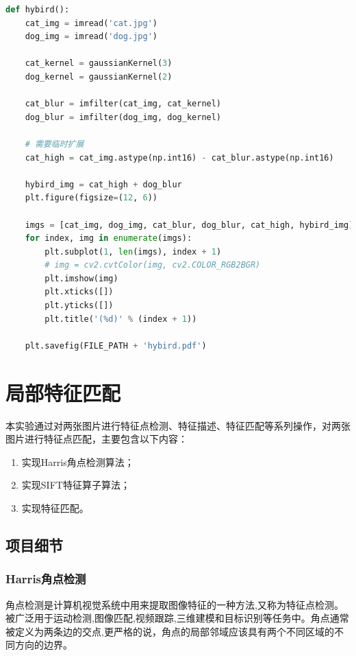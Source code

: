 \documentclass{article}
\begin{document}
\begin{lstlisting}[language=Python, frame=shadowbox]
def hybird():
    cat_img = imread('cat.jpg')
    dog_img = imread('dog.jpg')

    cat_kernel = gaussianKernel(3)
    dog_kernel = gaussianKernel(2)

    cat_blur = imfilter(cat_img, cat_kernel)
    dog_blur = imfilter(dog_img, dog_kernel)

    # 需要临时扩展
    cat_high = cat_img.astype(np.int16) - cat_blur.astype(np.int16)

    hybird_img = cat_high + dog_blur
    plt.figure(figsize=(12, 6))

    imgs = [cat_img, dog_img, cat_blur, dog_blur, cat_high, hybird_img]
    for index, img in enumerate(imgs):
        plt.subplot(1, len(imgs), index + 1)
        # img = cv2.cvtColor(img, cv2.COLOR_RGB2BGR)
        plt.imshow(img)
        plt.xticks([])
        plt.yticks([])
        plt.title('(%d)' % (index + 1))

    plt.savefig(FILE_PATH + 'hybird.pdf')
\end{lstlisting}

\section{局部特征匹配}
\begin{question}
    本实验通过对两张图片进行特征点检测、特征描述、特征匹配等系列操作，对两张图片进行特征点匹配，主要包含以下内容：
    \begin{enumerate}
        \item 实现Harris角点检测算法；
        \item 实现SIFT特征算子算法；
        \item 实现特征匹配。
    \end{enumerate}
\end{question}

\subsection{项目细节}
\subsubsection{Harris角点检测}
角点检测是计算机视觉系统中用来提取图像特征的一种方法,又称为特征点检测。被广泛用于运动检测,图像匹配,视频跟踪,三维建模和目标识别等任务中。角点通常被定义为两条边的交点,更严格的说，角点的局部邻域应该具有两个不同区域的不同方向的边界。
\end{document}
